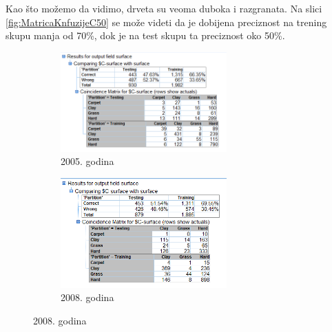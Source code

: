 \documentclass[a4paper]{article}
\begin{document}
Kao što možemo da vidimo, drveta su veoma duboka i razgranata. Na slici \ref{fig:MatricaKnfuzijeC50} se može videti da je dobijena preciznost na trening skupu manja od 70\%, dok je na test skupu ta preciznost oko 50\%. 

\begin{figure}[H]
	\begin{subfigure}[h]{\textwidth}
		\begin{center}
			\includegraphics[width=0.7\textwidth]{Klasifikacija/C50/Analysis_Surface2005.png}
		\end{center}
		\caption{2005. godina}
		\label{fig:MatricaKnfuzijeC502005}
	\end{subfigure}

	\vspace{0.5cm}
	\begin{subfigure}[h]{\textwidth}
		\begin{center}
			\includegraphics[width=0.7\textwidth]{Klasifikacija/C50/Analysis_Surface2008.png}
		\end{center}
		\caption{2008. godina}
		\label{fig:MatricaKnfuzijeC502008}
	\end{subfigure}
	

\end{figure}
\end{document}
